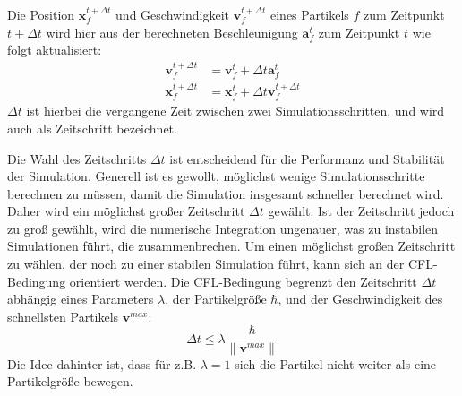 \documentclass[11pt,
a4paper,
parskip=half, %
BCOR=10mm, %
english,
ngerman]{scrreprt}
\begin{document}
Die Position $\textbf{x}_f^{t + \Delta t}$ und Geschwindigkeit $\textbf{v}_f^{t + \Delta t}$ eines Partikels $f$ zum Zeitpunkt $t + \Delta t$ 
wird hier aus der berechneten Beschleunigung $\textbf{a}_f^t$ zum Zeitpunkt $t$ wie folgt aktualisiert:
\begin{align}
    \textbf{v}_f^{t + \Delta t} &= \textbf{v}_f^t + \Delta t \textbf{a}_f^t\\
    \textbf{x}_f^{t + \Delta t} &= \textbf{x}_f^t + \Delta t \textbf{v}_f^{t + \Delta t}
\end{align}
$\Delta t$ ist hierbei die vergangene Zeit zwischen zwei Simulationsschritten, und wird auch als Zeitschritt bezeichnet.

Die Wahl des Zeitschritts $\Delta t$ ist entscheidend für die Performanz und Stabilität der Simulation.
Generell ist es gewollt, möglichst wenige Simulationsschritte berechnen zu müssen, damit die Simulation insgesamt schneller berechnet wird.
Daher wird ein möglichst großer Zeitschritt $\Delta t$ gewählt.
Ist der Zeitschritt jedoch zu groß gewählt, wird die numerische Integration ungenauer, was zu instabilen Simulationen führt, die zusammenbrechen.
Um einen möglichst großen Zeitschritt zu wählen, der noch zu einer stabilen Simulation führt, kann sich an der CFL-Bedingung orientiert werden.
Die CFL-Bedingung begrenzt den Zeitschritt $\Delta t$ abhängig eines Parameters $\lambda$, 
der Partikelgröße $\hbar$, und der Geschwindigkeit des schnellsten Partikels $\textbf{v}^{max}$:
\begin{equation}
    \Delta t \leq \lambda \frac{\hbar}{\|\textbf{v}^{max}\| }
\end{equation}
Die Idee dahinter ist, dass für z.B. $\lambda = 1$ sich die Partikel nicht weiter als eine Partikelgröße bewegen. \cite{koschier_smoothed_2020}
\end{document}
